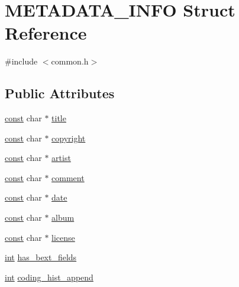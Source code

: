 \hypertarget{struct_m_e_t_a_d_a_t_a___i_n_f_o}{}\section{M\+E\+T\+A\+D\+A\+T\+A\+\_\+\+I\+N\+FO Struct Reference}
\label{struct_m_e_t_a_d_a_t_a___i_n_f_o}


{\ttfamily \#include $<$common.\+h$>$}

\subsection*{Public Attributes}
\begin{DoxyCompactItemize}
\item 
\hyperlink{getopt1_8c_a2c212835823e3c54a8ab6d95c652660e}{const} char $\ast$ \hyperlink{struct_m_e_t_a_d_a_t_a___i_n_f_o_a109609ece35a4b2243ad84eec9023bf6}{title}
\item 
\hyperlink{getopt1_8c_a2c212835823e3c54a8ab6d95c652660e}{const} char $\ast$ \hyperlink{struct_m_e_t_a_d_a_t_a___i_n_f_o_a182d0dea758370fc0e97ba0a8372f68d}{copyright}
\item 
\hyperlink{getopt1_8c_a2c212835823e3c54a8ab6d95c652660e}{const} char $\ast$ \hyperlink{struct_m_e_t_a_d_a_t_a___i_n_f_o_a4aa62249d609ad2776d95618484ff2f4}{artist}
\item 
\hyperlink{getopt1_8c_a2c212835823e3c54a8ab6d95c652660e}{const} char $\ast$ \hyperlink{struct_m_e_t_a_d_a_t_a___i_n_f_o_a0b6401b708b90833949f6f773a121551}{comment}
\item 
\hyperlink{getopt1_8c_a2c212835823e3c54a8ab6d95c652660e}{const} char $\ast$ \hyperlink{struct_m_e_t_a_d_a_t_a___i_n_f_o_ab33d54d801cf723d23300f2d08124956}{date}
\item 
\hyperlink{getopt1_8c_a2c212835823e3c54a8ab6d95c652660e}{const} char $\ast$ \hyperlink{struct_m_e_t_a_d_a_t_a___i_n_f_o_ae299618fdefe0c6e1b8851953927864a}{album}
\item 
\hyperlink{getopt1_8c_a2c212835823e3c54a8ab6d95c652660e}{const} char $\ast$ \hyperlink{struct_m_e_t_a_d_a_t_a___i_n_f_o_ad7a818ae9c1a106f792ed3a837031ece}{license}
\item 
\hyperlink{xmltok_8h_a5a0d4a5641ce434f1d23533f2b2e6653}{int} \hyperlink{struct_m_e_t_a_d_a_t_a___i_n_f_o_ae2f9d679674fce7a81a66a98feb2836c}{has\+\_\+bext\+\_\+fields}
\item 
\hyperlink{xmltok_8h_a5a0d4a5641ce434f1d23533f2b2e6653}{int} \hyperlink{struct_m_e_t_a_d_a_t_a___i_n_f_o_a4cf4ebeb9c0c475499417afa5cd379fd}{coding\+\_\+hist\+\_\+append}

\end{DoxyCompactItemize}
